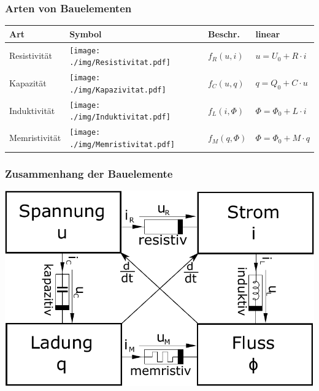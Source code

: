 \documentclass[fs, footer]{latex4ei}
\begin{document}
\begin{multicols*}{4}
		\subsubsection{Arten von Bauelementen}
		\begin{tabular}{l|l|l|l}
			Art & Symbol & Beschr. & linear\\ \hline
			Resistivität & \texttt{[image: ./img/Resistivitat.pdf]} & $f_R(u,i)$  & $u = U_0 + R \cdot i$\\
			Kapazität & \texttt{[image: ./img/Kapazivitat.pdf]} & $f_C(u,q)$ & $q = Q_0 + C \cdot u$\\
			Induktivität & \texttt{[image: ./img/Induktivitat.pdf]} & $f_L(i,\Phi)$ & $\Phi = \Phi_0 + L \cdot i$\\
			Memristivität & \texttt{[image: ./img/Memristivitat.pdf]} & $f_M(q,\Phi)$ & $\Phi = \Phi_0 + M \cdot q$\\
		\end{tabular}
		\subsubsection{Zusammenhang der Bauelemente}
		\begin{center}
			\includegraphics[scale=0.3]{./img/reactance_overview.pdf}
		\end{center}

\end{multicols*}
\end{document}

